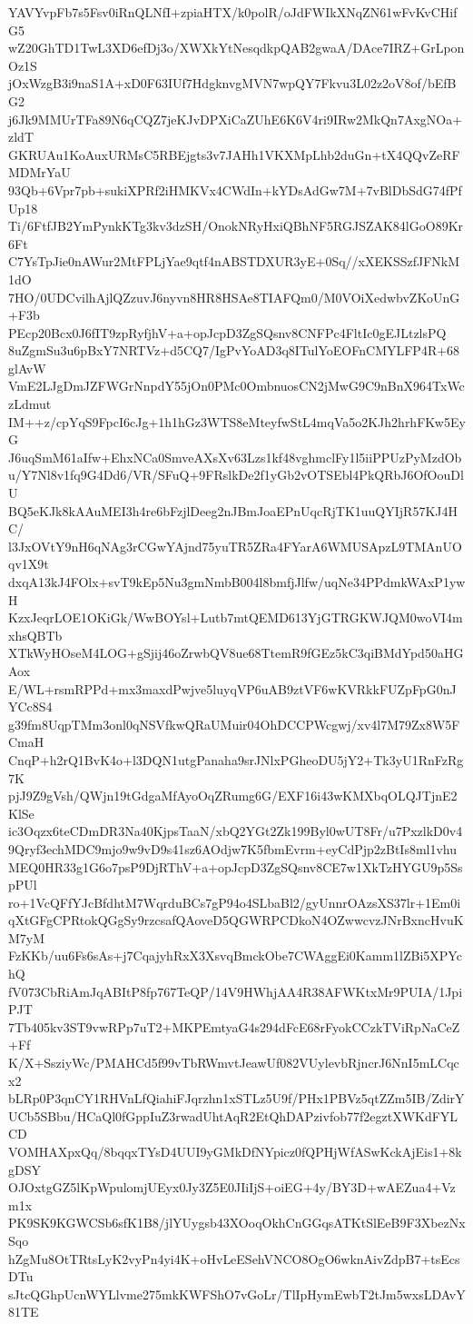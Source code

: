 YAVYvpFb7s5Fsv0iRnQLNfI+zpiaHTX/k0polR/oJdFWIkXNqZN61wFvKvCHifG5
wZ20GhTD1TwL3XD6efDj3o/XWXkYtNesqdkpQAB2gwaA/DAce7IRZ+GrLponOz1S
jOxWzgB3i9naS1A+xD0F63IUf7HdgknvgMVN7wpQY7Fkvu3L02z2oV8of/bEfBG2
j6Jk9MMUrTFa89N6qCQZ7jeKJvDPXiCaZUhE6K6V4ri9IRw2MkQn7AxgNOa+zldT
GKRUAu1KoAuxURMsC5RBEjgts3v7JAHh1VKXMpLhb2duGn+tX4QQvZeRFMDMrYaU
93Qb+6Vpr7pb+sukiXPRf2iHMKVx4CWdIn+kYDsAdGw7M+7vBlDbSdG74fPfUp18
Ti/6FtfJB2YmPynkKTg3kv3dzSH/OnokNRyHxiQBhNF5RGJSZAK84lGoO89Kr6Ft
C7YsTpJie0nAWur2MtFPLjYae9qtf4nABSTDXUR3yE+0Sq//xXEKSSzfJFNkM1dO
7HO/0UDCvilhAjlQZzuvJ6nyvn8HR8HSAe8TIAFQm0/M0VOiXedwbvZKoUnG+F3b
PEcp20Bcx0J6fIT9zpRyfjhV+a+opJcpD3ZgSQsnv8CNFPc4FltIc0gEJLtzlsPQ
8uZgmSu3u6pBxY7NRTVz+d5CQ7/IgPvYoAD3q8ITulYoEOFnCMYLFP4R+68glAvW
VmE2LJgDmJZFWGrNnpdY55jOn0PMc0OmbnuosCN2jMwG9C9nBnX964TxWczLdmut
IM++z/cpYqS9FpcI6cJg+1h1hGz3WTS8eMteyfwStL4mqVa5o2KJh2hrhFKw5EyG
J6uqSmM61aIfw+EhxNCa0SmveAXsXv63Lzs1kf48vghmclFy1l5iiPPUzPyMzdOb
u/Y7Nl8v1fq9G4Dd6/VR/SFuQ+9FRslkDe2f1yGb2vOTSEbl4PkQRbJ6OfOouDlU
BQ5eKJk8kAAuMEI3h4re6bFzjlDeeg2nJBmJoaEPnUqcRjTK1uuQYIjR57KJ4HC/
l3JxOVtY9nH6qNAg3rCGwYAjnd75yuTR5ZRa4FYarA6WMUSApzL9TMAnUOqv1X9t
dxqA13kJ4FOlx+svT9kEp5Nu3gmNmbB004l8bmfjJlfw/uqNe34PPdmkWAxP1ywH
KzxJeqrLOE1OKiGk/WwBOYsl+Lutb7mtQEMD613YjGTRGKWJQM0woVI4mxhsQBTb
XTkWyHOseM4LOG+gSjij46oZrwbQV8ue68TtemR9fGEz5kC3qiBMdYpd50aHGAox
E/WL+rsmRPPd+mx3maxdPwjve5luyqVP6uAB9ztVF6wKVRkkFUZpFpG0nJYCc8S4
g39fm8UqpTMm3onl0qNSVfkwQRaUMuir04OhDCCPWcgwj/xv4l7M79Zx8W5FCmaH
CnqP+h2rQ1BvK4o+l3DQN1utgPanaha9srJNlxPGheoDU5jY2+Tk3yU1RnFzRg7K
pjJ9Z9gVsh/QWjn19tGdgaMfAyoOqZRumg6G/EXF16i43wKMXbqOLQJTjnE2KlSe
ic3Oqzx6teCDmDR3Na40KjpsTaaN/xbQ2YGt2Zk199Byl0wUT8Fr/u7PxzlkD0v4
9Qryf3echMDC9mjo9w9vD9s41sz6AOdjw7K5fbmEvrm+eyCdPjp2zBtIs8ml1vhu
MEQ0HR33g1G6o7psP9DjRThV+a+opJcpD3ZgSQsnv8CE7w1XkTzHYGU9p5SspPUl
ro+1VcQFfYJcBfdhtM7WqrduBCs7gP94o4SLbaBl2/gyUnnrOAzsXS37lr+1Em0i
qXtGFgCPRtokQGgSy9rzcsafQAoveD5QGWRPCDkoN4OZwwcvzJNrBxncHvuKM7yM
FzKKb/uu6Fs6sAs+j7CqajyhRxX3XsvqBmckObe7CWAggEi0Kamm1lZBi5XPYchQ
fV073CbRiAmJqABItP8fp767TeQP/14V9HWhjAA4R38AFWKtxMr9PUIA/1JpiPJT
7Tb405kv3ST9vwRPp7uT2+MKPEmtyaG4s294dFcE68rFyokCCzkTViRpNaCeZ+Ff
K/X+SsziyWc/PMAHCd5f99vTbRWmvtJeawUf082VUylevbRjncrJ6NnI5mLCqcx2
bLRp0P3qnCY1RHVnLfQiahiFJqrzhn1xSTLz5U9f/PHx1PBVz5qtZZm5IB/ZdirY
UCb5SBbu/HCaQl0fGppIuZ3rwadUhtAqR2EtQhDAPzivfob77f2egztXWKdFYLCD
VOMHAXpxQq/8bqqxTYsD4UUI9yGMkDfNYpicz0fQPHjWfASwKckAjEis1+8kgDSY
OJOxtgGZ5lKpWpulomjUEyx0Jy3Z5E0JIiIjS+oiEG+4y/BY3D+wAEZua4+Vzm1x
PK9SK9KGWCSb6sfK1B8/jlYUygsb43XOoqOkhCnGGqsATKtSlEeB9F3XbezNxSqo
hZgMu8OtTRtsLyK2vyPn4yi4K+oHvLeESehVNCO8OgO6wknAivZdpB7+tsEcsDTu
sJtcQGhpUcnWYLlvme275mkKWFShO7vGoLr/TlIpHymEwbT2tJm5wxsLDAvY81TE
